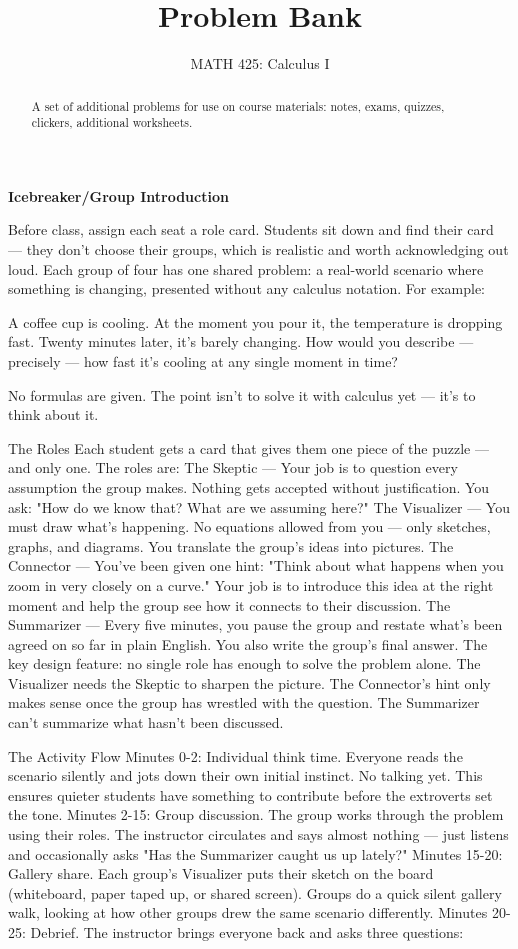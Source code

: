 \documentclass{ximera}
\title{Problem Bank}
\author{MATH 425: Calculus I}
\begin{document}
\begin{abstract}
    A set of additional problems for use on course materials: notes, exams, quizzes, clickers, additional worksheets.
\end{abstract}
\maketitle

\textbf{Icebreaker/Group Introduction}
\begin{exercise}
   Before class, assign each seat a role card. Students sit down and find their card — they don't choose their groups, which is realistic and worth acknowledging out loud.
Each group of four has one shared problem: a real-world scenario where something is changing, presented without any calculus notation. For example:

A coffee cup is cooling. At the moment you pour it, the temperature is dropping fast. Twenty minutes later, it's barely changing. How would you describe — precisely — how fast it's cooling at any single moment in time?

No formulas are given. The point isn't to solve it with calculus yet — it's to think about it.

The Roles
Each student gets a card that gives them one piece of the puzzle — and only one. The roles are:
The Skeptic — Your job is to question every assumption the group makes. Nothing gets accepted without justification. You ask: "How do we know that? What are we assuming here?"
The Visualizer — You must draw what's happening. No equations allowed from you — only sketches, graphs, and diagrams. You translate the group's ideas into pictures.
The Connector — You've been given one hint: "Think about what happens when you zoom in very closely on a curve." Your job is to introduce this idea at the right moment and help the group see how it connects to their discussion.
The Summarizer — Every five minutes, you pause the group and restate what's been agreed on so far in plain English. You also write the group's final answer.
The key design feature: no single role has enough to solve the problem alone. The Visualizer needs the Skeptic to sharpen the picture. The Connector's hint only makes sense once the group has wrestled with the question. The Summarizer can't summarize what hasn't been discussed.

The Activity Flow
Minutes 0-2: Individual think time. Everyone reads the scenario silently and jots down their own initial instinct. No talking yet. This ensures quieter students have something to contribute before the extroverts set the tone.
Minutes 2-15: Group discussion. The group works through the problem using their roles. The instructor circulates and says almost nothing — just listens and occasionally asks "Has the Summarizer caught us up lately?"
Minutes 15-20: Gallery share. Each group's Visualizer puts their sketch on the board (whiteboard, paper taped up, or shared screen). Groups do a quick silent gallery walk, looking at how other groups drew the same scenario differently.
Minutes 20-25: Debrief. The instructor brings everyone back and asks three questions:


\end{exercise}
\end{document}
